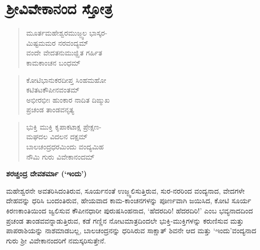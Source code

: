 \chapter*{ಶ್ರೀವಿವೇಕಾನಂದ ಸ್ತೋತ್ರ}

\begin{verse}
ಮೂರ್ತಮಹೇಶ್ವರಮುಜ್ಜ್ವಲ ಭಾಸ್ಕರ-\\ಮಿಷ್ಟಮಮರ ನರವಂದ್ಯಮ್\\ವಂದೇ ವೇದತನುಮುಜ್ಝಿತ ಗರ್ಹಿತ\\ಕಾಮಕಾಂಚನ ಬಂಧಮ್
\end{verse}

\begin{verse}
ಕೋಟಿಭಾನುಕರದೀಪ್ತ ಸಿಂಹಮಹೋ\\ಕಟಿತಟಕೌಪೀನವಂತಮ್\\ಅಭೀರಭೀಃ ಹುಂಕಾರ ನಾದಿತ ದಿಙ್ಮುಖ\\ಪ್ರಚಂಡ ತಾಂಡವನೃತ್ಯ
\end{verse}

\begin{verse}
ಭುಕ್ತಿ ಮುಕ್ತಿ 
 ಕೃಪಾಕಟಾಕ್ಷ ಪ್ರೇಕ್ಷಣ-\\ಮಘದಲ ವಿದಲನ ದಕ್ಷಮ್\\ಬಾಲಚಂದ್ರಧರಮಿಂದು ವಂದ್ಯಮಿಹ\\ನೌಮಿ ಗುರು ವಿವೇಕಾನಂದಮ್
\end{verse}

\begin{flushright}
\textbf{ಶರಚ್ಚಂದ್ರ ದೇವಶರ್ಮಾ (‘ಇಂದು’)}
\end{flushright}

ಮಹೇಶ್ವರನೇ ಅವತರಿಸಿದಂತಿರುವ, ಸೂರ್ಯನಂತೆ ಉಜ್ಜ್ವಲಿಸುತ್ತಿರುವ, ಸುರ-ನರರಿಂದ ವಂದ್ಯನಾದ, ವೇದಗಳೇ ದೇಹವನ್ನು ಧರಿಸಿ ಬಂದಂತಿರುವ, ಹೇಯವಾದ ಕಾಮ-ಕಾಂಚನಗಳನ್ನು ಪೂರ್ಣವಾಗಿ ಜಯಿಸಿದ, ಕೋಟಿ ಸೂರ್ಯ ಕಿರಣಕಾಂತಿಯಿಂದ ಜ್ವಲಿಸುವ ಕೌಪೀನಧಾರೀ ಪುರುಷಸಿಂಹನಾದ, ‘ಹೆದರದಿರಿ! ಹೆದರದಿರಿ!’ ಎಂಬ ಭವ್ಯನಾದದಿಂದ ಪ್ರಚಂಡ ತಾಂಡವವನ್ನಾಡುತ್ತಿರುವ, ಕಡೆ ಗಣ್ಣಿನ ನೋಟಮಾತ್ರದಿಂದಲೇ ಭುಕ್ತಿ-ಮುಕ್ತಿಗಳನ್ನು ಕರುಣಿಸುವ ಮತ್ತು ಪಾಪರಾಶಿಯನ್ನು ನಾಶಮಾಡಬಲ್ಲ, ಬಾಲಚಂದ್ರನನ್ನು ಧರಿಸಿರುವ ಸಾಕ್ಷಾತ್ ಶಿವನೇ ಆದ ಮತ್ತು ‘ಇಂದು’ವಂದ್ಯನಾದ ಗುರು ಶ್ರೀ ವಿವೇಕಾನಂದರಿಗೆ ನಮಸ್ಕರಿಸುತ್ತೇನೆ.

